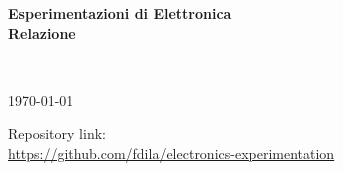 \begin{titlepage}

  \begin{center}
    \vspace*{4cm}

    \huge
    \textbf{Esperimentazioni di Elettronica} \\
    \LARGE
    \vspace{0.25cm}
    \textbf{Relazione}
    
    
    \vspace{3cm}
    
    \Large
     \\
    \vspace{0.15cm}
    \vspace{2cm}
    
    \large
    \today
    \vfill
    
    \normalsize	
    Repository link: \\
    \href{https://github.com/fdila/electronics-experimentation}{https://github.com/fdila/electronics-experimentation}
    
  \end{center}

\end{titlepage}